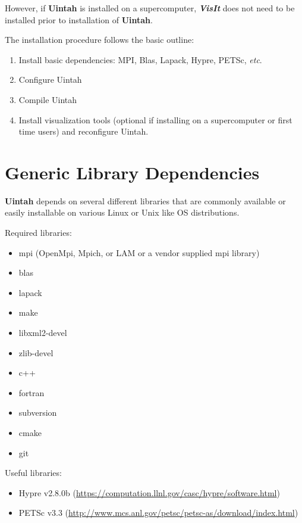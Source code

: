 \documentclass[12pt]{article}
\begin{document}
However, if \textbf{Uintah} is installed on a supercomputer,
\textbf{\emph{VisIt}} does not need to be installed prior to
installation of \textbf{Uintah}.

The installation procedure follows the basic outline:

\begin{enumerate}

\item Install basic dependencies: MPI, Blas, Lapack, Hypre, PETSc, \emph{etc}.

\item Configure Uintah

\item Compile Uintah

\item Install visualization tools (optional if installing on a
  supercomputer or first time users) and reconfigure Uintah.


\end{enumerate}



\section{Generic Library Dependencies}

\textbf{Uintah} depends on several different libraries that are
commonly available or easily installable on various Linux or Unix like
OS distributions.

Required libraries:
\begin{itemize}
\item mpi (OpenMpi, Mpich, or LAM or a vendor supplied mpi library)
\item blas
\item lapack
\item make
\item libxml2-devel
\item zlib-devel
\item c++
\item fortran
\item subversion
\item cmake
\item git

\end{itemize}

Useful libraries:
\begin{itemize}
\item Hypre v2.8.0b (\url{https://computation.llnl.gov/casc/hypre/software.html})
\item PETSc v3.3 (\url{http://www.mcs.anl.gov/petsc/petsc-as/download/index.html})
\end{itemize}
\end{document}
